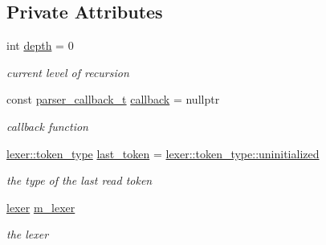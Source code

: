 \subsection*{Private Attributes}
\begin{DoxyCompactItemize}
\item 
\hypertarget{classnlohmann_1_1basic__json_1_1parser_a8380d4d5ce79ab1ec9435c843fd40b07}{}\label{classnlohmann_1_1basic__json_1_1parser_a8380d4d5ce79ab1ec9435c843fd40b07} 
int \hyperlink{classnlohmann_1_1basic__json_1_1parser_a8380d4d5ce79ab1ec9435c843fd40b07}{depth} = 0
\begin{DoxyCompactList}\small\item\em current level of recursion \end{DoxyCompactList}\item 
\hypertarget{classnlohmann_1_1basic__json_1_1parser_a1ddac33be60094b071f95a1010382654}{}\label{classnlohmann_1_1basic__json_1_1parser_a1ddac33be60094b071f95a1010382654} 
const \hyperlink{classnlohmann_1_1basic__json_a9e35475e2027520a78e09f460dbe048a}{parser\+\_\+callback\+\_\+t} \hyperlink{classnlohmann_1_1basic__json_1_1parser_a1ddac33be60094b071f95a1010382654}{callback} = nullptr
\begin{DoxyCompactList}\small\item\em callback function \end{DoxyCompactList}\item 
\hypertarget{classnlohmann_1_1basic__json_1_1parser_adfb1017b95ae14e52c585e1296e8faac}{}\label{classnlohmann_1_1basic__json_1_1parser_adfb1017b95ae14e52c585e1296e8faac} 
\hyperlink{classnlohmann_1_1basic__json_1_1lexer_a96887d6cd131e3d3a85a9d71fbdbcdf7}{lexer\+::token\+\_\+type} \hyperlink{classnlohmann_1_1basic__json_1_1parser_adfb1017b95ae14e52c585e1296e8faac}{last\+\_\+token} = \hyperlink{classnlohmann_1_1basic__json_1_1lexer_a96887d6cd131e3d3a85a9d71fbdbcdf7a42dd1a73d072bb6bf3f494f22b15db8e}{lexer\+::token\+\_\+type\+::uninitialized}
\begin{DoxyCompactList}\small\item\em the type of the last read token \end{DoxyCompactList}\item 
\hypertarget{classnlohmann_1_1basic__json_1_1parser_ae07b3100692718072e199c6e2a8e1e1b}{}\label{classnlohmann_1_1basic__json_1_1parser_ae07b3100692718072e199c6e2a8e1e1b} 
\hyperlink{classnlohmann_1_1basic__json_1_1lexer}{lexer} \hyperlink{classnlohmann_1_1basic__json_1_1parser_ae07b3100692718072e199c6e2a8e1e1b}{m\+\_\+lexer}
\begin{DoxyCompactList}\small\item\em the lexer \end{DoxyCompactList}\end{DoxyCompactItemize}


